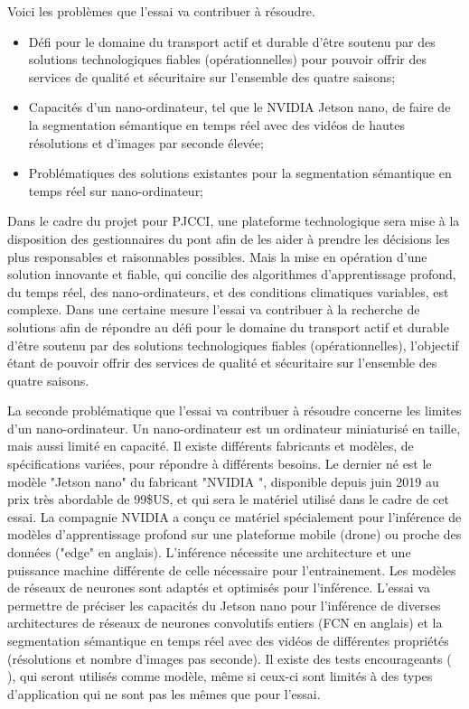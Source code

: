 \par Voici les problèmes que l'essai va contribuer à résoudre.
\begin{itemize}
   \item Défi pour le domaine du transport actif et durable d'être soutenu par des solutions technologiques fiables (opérationnelles) pour pouvoir offrir des services de qualité et sécuritaire sur l'ensemble des quatre saisons;
   \item Capacités d'un nano-ordinateur, tel que le NVIDIA Jetson nano, de faire de la segmentation sémantique en temps réel avec des vidéos de hautes résolutions et d'images par seconde élevée;
   \item Problématiques des solutions existantes pour la segmentation sémantique en temps réel sur nano-ordinateur;
\end{itemize}
\vspace{1\baselineskip}
\par Dans le cadre du projet pour PJCCI, une plateforme technologique sera mise à la disposition des gestionnaires du pont afin de les aider à prendre les décisions les plus responsables et raisonnables possibles. Mais la mise en opération d'une solution innovante et fiable, qui concilie des algorithmes d'apprentissage profond, du temps réel, des nano-ordinateurs, et des conditions climatiques variables, est complexe. Dans une certaine mesure l'essai va contribuer à la recherche de solutions afin de répondre au défi pour le domaine du transport actif et durable d'être soutenu par des solutions technologiques fiables (opérationnelles), l'objectif étant de pouvoir offrir des services de qualité et sécuritaire sur l'ensemble des quatre saisons.
\par La seconde problématique que l'essai va contribuer à résoudre concerne les limites d'un nano-ordinateur. Un nano-ordinateur est un ordinateur miniaturisé en taille, mais aussi limité en capacité. Il existe différents fabricants et modèles, de spécifications variées, pour répondre à différents besoins. Le dernier né est le modèle "Jetson nano" du fabricant "NVIDIA ", disponible depuis juin 2019 au prix très abordable de 99\$US, et qui sera le matériel utilisé dans le cadre de cet essai. La compagnie NVIDIA a conçu ce matériel spécialement pour l'inférence de modèles d'apprentissage profond sur une plateforme mobile (drone) ou proche des données ("edge" en anglais). L'inférence nécessite une architecture et une puissance machine différente de celle nécessaire pour l'entrainement. Les modèles de réseaux de neurones sont adaptés et optimisés pour l'inférence. L'essai va permettre de préciser les capacités du Jetson nano pour l'inférence de diverses architectures de réseaux de neurones convolutifs entiers (FCN en anglais) et la segmentation sémantique en temps réel avec des vidéos de différentes propriétés (résolutions et nombre d'images pas seconde). Il existe des tests encourageants (\cite{nvidia_jetson_2019-1} \cite{nguyen_mavnet_2019} \cite{chong_real-time_1992}), qui seront utilisés comme modèle, même si ceux-ci sont limités à des types d'application qui ne sont pas les mêmes que pour l'essai.
